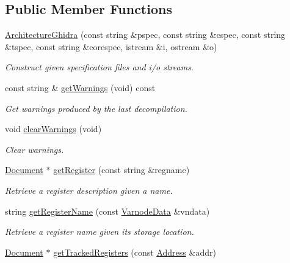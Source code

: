 \subsection*{Public Member Functions}
\begin{DoxyCompactItemize}
\item 
\mbox{\hyperlink{class_architecture_ghidra_ac2dd133afc911293c1c6d059661fbf0f}{Architecture\+Ghidra}} (const string \&pspec, const string \&cspec, const string \&tspec, const string \&corespec, istream \&i, ostream \&o)
\begin{DoxyCompactList}\small\item\em Construct given specification files and i/o streams. \end{DoxyCompactList}\item 
const string \& \mbox{\hyperlink{class_architecture_ghidra_a0b42cdf80b24e206fe2022b5937daa42}{get\+Warnings}} (void) const
\begin{DoxyCompactList}\small\item\em Get warnings produced by the last decompilation. \end{DoxyCompactList}\item 
void \mbox{\hyperlink{class_architecture_ghidra_ae2784eafe545498ffac4b3b783ca5bbc}{clear\+Warnings}} (void)
\begin{DoxyCompactList}\small\item\em Clear warnings. \end{DoxyCompactList}\item 
\mbox{\hyperlink{class_document}{Document}} $\ast$ \mbox{\hyperlink{class_architecture_ghidra_ad1e8a5eaefce58038fc774a6083818e8}{get\+Register}} (const string \&regname)
\begin{DoxyCompactList}\small\item\em Retrieve a register description given a name. \end{DoxyCompactList}\item 
string \mbox{\hyperlink{class_architecture_ghidra_a37f48166235bff1cf154a989aa22bfde}{get\+Register\+Name}} (const \mbox{\hyperlink{struct_varnode_data}{Varnode\+Data}} \&vndata)
\begin{DoxyCompactList}\small\item\em Retrieve a register name given its storage location. \end{DoxyCompactList}\item 
\mbox{\hyperlink{class_document}{Document}} $\ast$ \mbox{\hyperlink{class_architecture_ghidra_a124a08d65c25451f2900064445ca704f}{get\+Tracked\+Registers}} (const \mbox{\hyperlink{class_address}{Address}} \&addr)

\end{DoxyCompactItemize}
